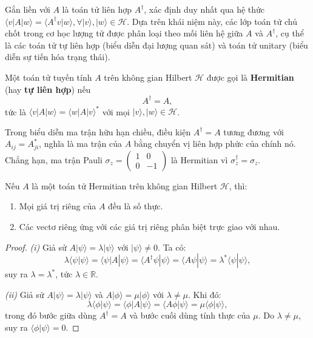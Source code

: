 \begin{definition}
Gắn liền với $A$ là toán tử liên hợp $A^\dagger$, xác định duy nhất qua hệ thức $\langle v | A | w \rangle = \langle A^\dagger v | w \rangle, \forall |v\rangle, |w\rangle \in \mathcal{H}$. Dựa trên khái niệm này, các lớp toán tử chủ chốt trong cơ học lượng tử được phân loại theo mối liên hệ giữa $A$ và $A^\dagger$, cụ thể là các toán tử tự liên hợp (biểu diễn đại lượng quan sát) và toán tử unitary (biểu diễn sự tiến hóa trạng thái).
\end{definition}

\begin{definition}
Một toán tử tuyến tính $A$ trên không gian Hilbert $\mathcal{H}$ được gọi là
\textbf{Hermitian} (hay \textbf{tự liên hợp}) nếu
$$A^\dagger = A,$$
tức là $\langle v | A | w \rangle = \langle w | A | v \rangle^*$
với mọi $|v\rangle, |w\rangle \in \mathcal{H}$.
\end{definition}

\begin{remark}
Trong biểu diễn ma trận hữu hạn chiều, điều kiện $A^\dagger = A$ tương đương với
$A_{ij} = A_{ji}^*$, nghĩa là ma trận của $A$ bằng chuyển vị liên hợp phức của chính nó.\\
Chẳng hạn, ma trận Pauli $\sigma_z = \begin{pmatrix} 1 & 0 \\ 0 & -1 \end{pmatrix}$
là Hermitian vì $\sigma_z^\dagger = \sigma_z$.
\end{remark}

\begin{proposition}
\label{prop:hermitian-spectrum}
Nếu $A$ là một toán tử Hermitian trên không gian Hilbert $\mathcal{H}$, thì:
\begin{enumerate}[label=(\roman*)]
    \item Mọi giá trị riêng của $A$ đều là số thực.
    \item Các vectơ riêng ứng với các giá trị riêng phân biệt trực giao với nhau.
\end{enumerate}
\end{proposition}

\begin{proof}
\textit{(i)} Giả sử $A|\psi\rangle = \lambda|\psi\rangle$ với $|\psi\rangle \neq 0$. Ta có:
$$\lambda \langle\psi|\psi\rangle = \langle\psi|A|\psi\rangle
= \langle A^\dagger\psi|\psi\rangle = \langle A\psi|\psi\rangle
= \lambda^*\langle\psi|\psi\rangle,$$
suy ra $\lambda = \lambda^*$, tức $\lambda \in \mathbb{R}$.

\textit{(ii)} Giả sử $A|\psi\rangle = \lambda|\psi\rangle$ và $A|\phi\rangle = \mu|\phi\rangle$
với $\lambda \neq \mu$. Khi đó:
$$\lambda\langle\phi|\psi\rangle = \langle\phi|A|\psi\rangle
= \langle A\phi|\psi\rangle = \mu\langle\phi|\psi\rangle,$$
trong đó bước giữa dùng $A^\dagger = A$ và bước cuối dùng tính thực của $\mu$.
Do $\lambda \neq \mu$, suy ra $\langle\phi|\psi\rangle = 0$.
\end{proof}

